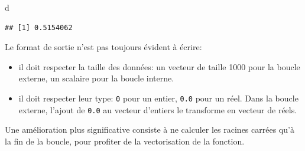 \documentclass[
  12pt,
  french,
  a4paper,
  extrafontsizes,onecolumn,openright
  ]{memoir}
\newenvironment{Shaded}{\begin{snugshade}}{\end{snugshade}}
\newcommand{\ControlFlowTok}[1]{\textcolor[rgb]{0.13,0.29,0.53}{\textbf{#1}}}
\newcommand{\DecValTok}[1]{\textcolor[rgb]{0.00,0.00,0.81}{#1}}
\newcommand{\KeywordTok}[1]{\textcolor[rgb]{0.13,0.29,0.53}{\textbf{#1}}}
\newcommand{\NormalTok}[1]{#1}
\newcommand{\OperatorTok}[1]{\textcolor[rgb]{0.81,0.36,0.00}{\textbf{#1}}}
\newcommand{\StringTok}[1]{\textcolor[rgb]{0.31,0.60,0.02}{#1}}
\providecommand{\tightlist}{%
  \setlength{\itemsep}{0pt}\setlength{\parskip}{0pt}}
\begin{document}
\begin{Shaded}
\begin{Highlighting}[]
\NormalTok{d}
\end{Highlighting}
\end{Shaded}

\begin{verbatim}
## [1] 0.5154062
\end{verbatim}

\normalsize
Le format de sortie n'est pas toujours évident à écrire:

\begin{itemize}
\tightlist
\item
  il doit respecter la taille des données: un vecteur de taille 1000 pour la boucle externe, un scalaire pour la boucle interne.
\item
  il doit respecter leur type: \texttt{0} pour un entier, \texttt{0.0} pour un réel. Dans la boucle externe, l'ajout de \texttt{0.0} au vecteur d'entiers le transforme en vecteur de réels.
\end{itemize}

Une amélioration plus significative consiste à ne calculer les racines carrées qu'à la fin de la boucle, pour profiter de la vectorisation de la fonction.

\scriptsize

\begin{Shaded}
\end{Shaded}
\end{document}
